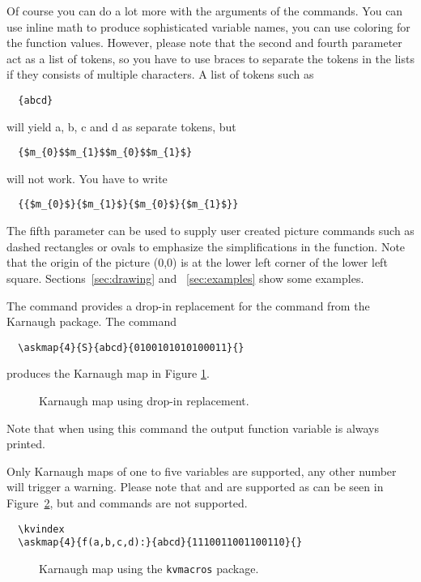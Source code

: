 \documentclass[a4paper,10pt]{ltxdoc}
\newcommand\Package[1]{\texttt{#1}}
\begin{document}
Of course you can do a lot more with the arguments of the commands. You
can use inline math to produce sophisticated variable names, you can
use coloring for the function values. However, please note that the second
and fourth parameter act as a list of tokens, so you have to use braces to
separate the tokens in the lists if they consists of multiple characters.
A list of tokens such as
\begin{verbatim}
  {abcd}
\end{verbatim}
will yield a, b, c and d as separate tokens, but
\begin{verbatim}
  {$m_{0}$$m_{1}$$m_{0}$$m_{1}$}
\end{verbatim}
will not work. You have to write
\begin{verbatim}
  {{$m_{0}$}{$m_{1}$}{$m_{0}$}{$m_{1}$}}
\end{verbatim}

The fifth parameter can be used to supply user created picture commands
such as dashed rectangles or ovals to emphasize the simplifications in the
function. Note that the origin of the picture (0,0) is at the lower left
corner of the lower left square. Sections~\ref{sec:drawing} and~%
\ref{sec:examples} show some examples.
\bigskip



The command  provides a drop-in replacement for the command
 from the Karnaugh package. The command
\begin{verbatim}
  \askmap{4}{S}{abcd}{0100101010100011}{}
\end{verbatim}
produces the Karnaugh map in Figure \ref{fig:askmap}.
\begin{figure}[H]
\centering
\askmapunitlength=0.88cm
\caption{Karnaugh map using drop-in replacement.}
\label{fig:askmap}
\end{figure}

Note that when using this command the output function variable is always
printed.

Only Karnaugh maps of one to five variables are supported, any other number
will trigger a warning. Please note that  and  are
supported as can be seen in Figure~\ref{fig:karnaughmapindex}, but
 and  commands are not supported.
\begin{verbatim}
  \kvindex
  \askmap{4}{f(a,b,c,d):}{abcd}{1110011001100110}{}
\end{verbatim}
\begin{figure}[H]
\centering
\askmapunitlength=0.88cm
  \kvindex
\caption{Karnaugh map using the \Package{kvmacros} package.}
\label{fig:karnaughmapindex}
\end{figure}
\end{document}

